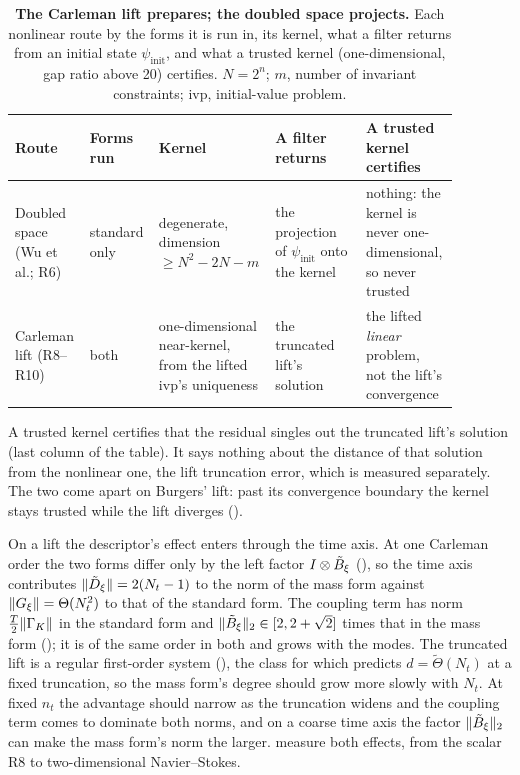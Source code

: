 \begin{table}[!htbp]
    \centering
    \caption[Preparation by the Carleman lift against projection by the doubled space]{\textbf{The Carleman lift prepares; the doubled space projects.} Each nonlinear route by the forms it is run in, its kernel, what a filter returns from an initial state $\psi_{\mathrm{init}}$, and what a trusted kernel (one-dimensional, gap ratio above 20) certifies. $N=2^n$; $m$, number of invariant constraints; \gls{ivp}, initial-value problem.}
    \label{tab:prep-vs-proj}
    \small
    \begin{tabular}{@{}p{0.16\linewidth} p{0.12\linewidth} p{0.2\linewidth} p{0.2\linewidth} p{0.2\linewidth}@{}}
        \toprule
        Route & Forms run & Kernel & A filter returns & A trusted kernel certifies \\
        \midrule
        Doubled space (Wu et al.; R6) & standard only & degenerate, dimension $\ge N^2-2N-m$ & the projection of $\psi_{\mathrm{init}}$ onto the kernel & nothing: the kernel is never one-dimensional, so never trusted \\
        Carleman lift (R8--R10) & both & one-dimensional near-kernel, from the lifted \gls{ivp}'s uniqueness & the truncated lift's solution & the lifted \emph{linear} problem, not the lift's convergence \\
        \bottomrule
    \end{tabular}
\end{table}

A trusted kernel certifies that the residual singles out the truncated lift's solution (last column of the table). It says nothing about the distance of that solution from the nonlinear one, the lift truncation error, which is measured separately. The two come apart on Burgers' lift: past its convergence boundary the kernel stays trusted while the lift diverges ().

On a lift the descriptor's effect enters through the time axis. At one Carleman order the two forms differ only by the left factor $I\otimes\tilde{B}_\xi$ (), so the time axis contributes $\|\tilde{D}_\xi\|=2(N_t-1)$ to the norm of the mass form against $\|G_\xi\|=\Theta(N_t^2)$ to that of the standard form. The coupling term has norm $\tfrac T2\|\Gamma_K\|$ in the standard form and $\|\tilde{B}_\xi\|_2\in[2,2+\sqrt2]$ times that in the mass form (); it is of the same order in both and grows with the modes. The truncated lift is a regular first-order system (), the class for which  predicts $d=\tilde\Theta(N_t)$ at a fixed truncation, so the mass form's degree should grow more slowly with $N_t$. At fixed $n_t$ the advantage should narrow as the truncation widens and the coupling term comes to dominate both norms, and on a coarse time axis the factor $\|\tilde{B}_\xi\|_2$ can make the mass form's norm the larger.  measure both effects, from the scalar R8 to two-dimensional Navier--Stokes.
